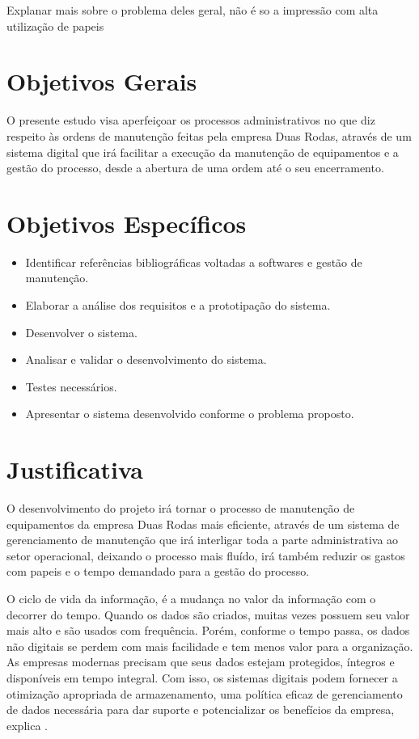 {\color{red}Explanar mais sobre o problema deles geral, não é so a impressão com alta utilização de papeis }

\section{Objetivos Gerais}

O presente estudo visa aperfeiçoar os processos administrativos no que diz respeito às ordens de manutenção feitas pela empresa Duas Rodas, através de um sistema digital que irá facilitar a execução da manutenção de equipamentos e a gestão do processo, desde a abertura de uma ordem até o seu encerramento.

\section{Objetivos Específicos}

\begin{itemize}
	\item Identificar referências bibliográficas voltadas a softwares e gestão de manutenção.
	\item Elaborar a análise dos requisitos e a prototipação do sistema.
	\item Desenvolver o sistema.
	\item Analisar e validar o desenvolvimento do sistema.
	\item Testes necessários.
	\item Apresentar o sistema desenvolvido conforme o problema proposto.
\end{itemize}


\section{Justificativa}

O desenvolvimento do projeto irá tornar o processo de manutenção de equipamentos da empresa Duas Rodas mais eficiente, através de um sistema de gerenciamento de manutenção que irá interligar toda a parte administrativa ao setor operacional, deixando o processo mais fluído, irá também reduzir os gastos com papeis e o tempo demandado para a gestão do processo.

O ciclo de vida da informação, é a mudança no valor da informação com o decorrer do tempo. Quando os dados são criados, muitas vezes possuem seu valor mais alto e são usados com frequência. Porém, conforme o tempo passa, os dados não digitais se perdem com mais facilidade e tem menos valor para a organização.  As empresas modernas precisam que seus dados estejam protegidos, íntegros e disponíveis em tempo integral. Com isso, os sistemas digitais podem fornecer a otimização apropriada de armazenamento, uma política eficaz de gerenciamento de dados necessária para dar suporte e potencializar os benefícios da empresa, explica \cite{somasundaram2009armazenamento}.


